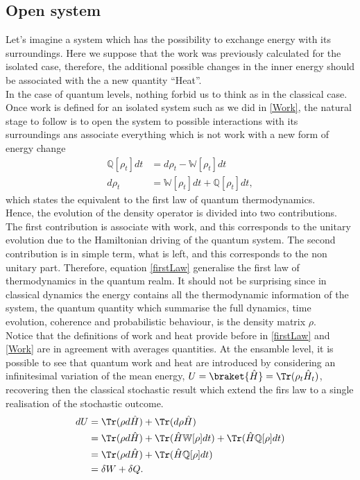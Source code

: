 \subsection{Open system}
Let's imagine a system which has the possibility to exchange energy with its surroundings. Here we suppose that the work was previously calculated for the isolated case, therefore, the additional possible changes in the inner energy should be associated with the a new quantity ``Heat''.\\
In the case of quantum levels, nothing forbid us to think as in the classical case. Once work is defined for an isolated system such as we did in \eqref{Work}, the natural stage to follow is to open the system to possible interactions with its surroundings ans associate everything which is not work with a new form of energy change
\begin{align}
\mathbb{Q}[\rho_t]dt&=d\rho_t -\mathbb{W}[\rho_t]dt\nonumber\\
d\rho_t&=\mathbb{W}[\rho_t]dt+\mathbb{Q}[\rho_t]dt,
\label{firstLaw}
\end{align}
which states the equivalent to the first law of quantum thermodynamics.\\
Hence, the evolution of the density operator is divided into two contributions. The first contribution is associate with work, and this corresponds to the unitary evolution due to the Hamiltonian driving of the quantum system. The second contribution is in simple term, what is left, and this corresponds to the non unitary part. Therefore, equation \eqref{firstLaw} generalise the first law of thermodynamics in the quantum realm. It should not be surprising since in classical dynamics the energy contains all the thermodynamic information of the system, the quantum quantity which summarise the full dynamics, time evolution, coherence and probabilistic behaviour, is the density matrix $\rho$.\\
Notice that the definitions of work and heat provide before in \eqref{firstLaw} and \eqref{Work} are in agreement with averages quantities. At the ensamble level, it is possible to see that quantum work and heat are introduced by considering an infinitesimal variation of the mean energy, $U=\braket{\hat{H}}=\Tr(\rho_t\hat{H}_t)$, recovering then the classical stochastic result which extend the firs law to a single realisation of the stochastic outcome.
\begin{align}
dU&=\Tr(\rho d\hat{H})+\Tr (d\rho \hat{H})\nonumber\\
&=\Tr(\rho d\hat{H})+\Tr(\hat{H}\mathbb{W}[\rho]dt)+\Tr(\hat{H}\mathbb{Q}[\rho]dt)\nonumber\\
&=\Tr(\rho d\hat{H})+\Tr(\hat{H}\mathbb{Q}[\rho]dt)\nonumber\\
&=\delta W + \delta Q.
\label{reductionfirstlaw}
\end{align}
